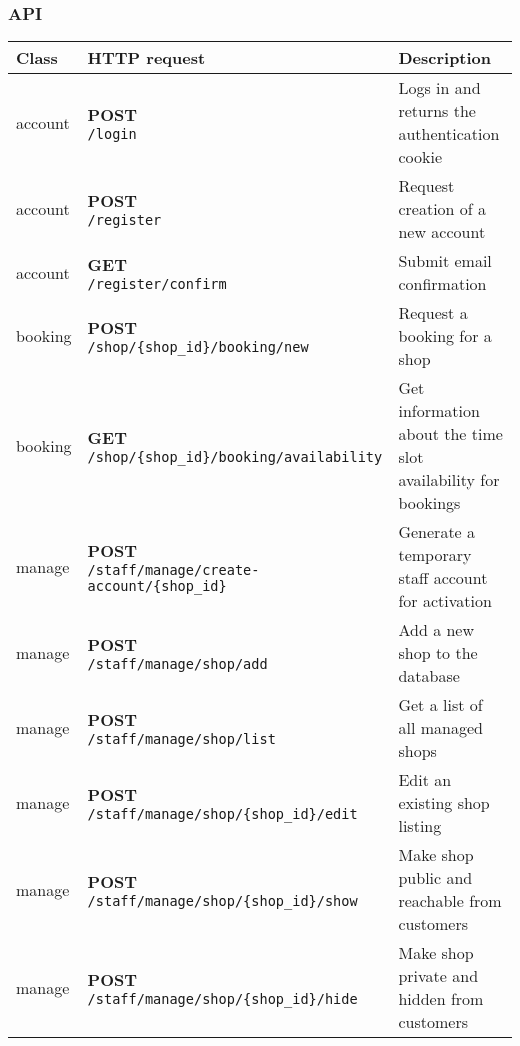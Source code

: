 \subsubsection{API}


\begin{tabularx}{\textwidth}{|p{}|l|X|} \hline
\textbf{Class} & \textbf{HTTP request} & \textbf{Description} \\\hline\endhead
account & \makecell{\textbf{POST} \\ \texttt{/login}}  & Logs in and returns the authentication  cookie \\\hline
account & \makecell{\textbf{POST} \\ \texttt{/register}}  & Request creation of a new account \\\hline
account & \makecell{\textbf{GET} \\ \texttt{/register/confirm}}  & Submit email confirmation \\\hline
booking & \makecell{\textbf{POST} \\ \texttt{/shop/\{shop\_id\}/booking/new}}  & Request a booking for a shop \\\hline
booking & \makecell{\textbf{GET} \\ \texttt{/shop/\{shop\_id\}/booking/availability}}  & Get information about the time slot availability for bookings \\\hline
manage & \makecell{\textbf{POST} \\ \texttt{/staff/manage/create-account/\{shop\_id\}}}  & Generate a temporary staff account for activation \\\hline
manage & \makecell{\textbf{POST} \\ \texttt{/staff/manage/shop/add}}  & Add a new shop to the database \\\hline
manage & \makecell{\textbf{POST} \\ \texttt{/staff/manage/shop/list}}  & Get a list of all managed shops \\\hline
manage & \makecell{\textbf{POST} \\ \texttt{/staff/manage/shop/\{shop\_id\}/edit}}  & Edit an existing shop listing \\\hline
manage & \makecell{\textbf{POST} \\ \texttt{/staff/manage/shop/\{shop\_id\}/show}}  & Make shop public and reachable from customers \\\hline
manage & \makecell{\textbf{POST} \\ \texttt{/staff/manage/shop/\{shop\_id\}/hide}}  & Make shop private and hidden from customers \\\hline

\end{tabularx}
